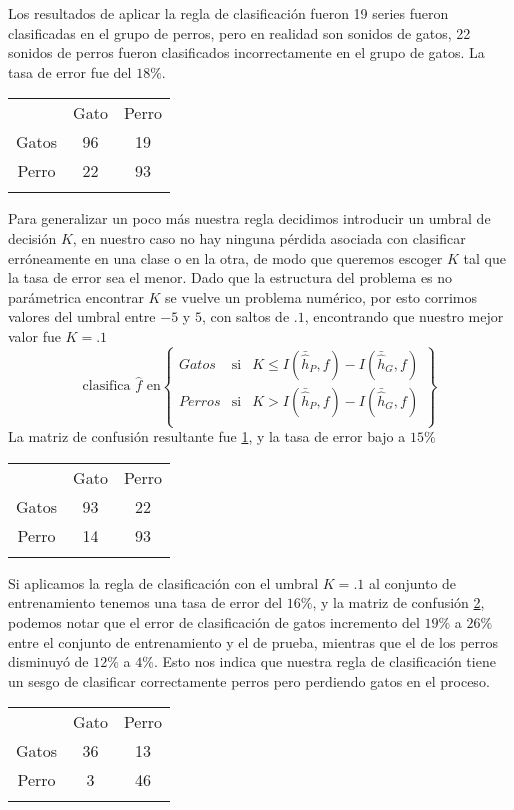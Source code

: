 \documentclass[twocolumn,10pt]{asme2ej}
\begin{document}
Los resultados de aplicar la regla de clasificaci\'on fueron 19 series fueron clasificadas en el grupo de perros, pero en realidad son sonidos de gatos, 22 sonidos de perros fueron clasificados incorrectamente en el grupo de gatos. La tasa de error fue del $18\%$.\\
\begin{tabular}{ccc}
 & Gato & Perro\\
 Gatos & 96& 19\\
Perro & 22 & 93\\
\label{tbl:confusion_entre1}
\end{tabular}

Para generalizar un poco m\'as nuestra regla decidimos introducir un umbral de decisi\'on $K$, en nuestro caso no hay ninguna p\'erdida asociada con clasificar err\'oneamente en una clase o en la otra, de modo que queremos escoger $K$ tal que la tasa de error sea el menor. Dado que la estructura del problema es no par\'ametrica encontrar $K$ se vuelve un problema num\'erico, por esto corrimos valores del umbral entre $-5$ y $5$, con saltos de $.1$, encontrando que nuestro mejor valor fue $K=.1$
$$\text{clasifica } \hat{f} \text{ en}\left\{
\begin{array}{ccc}
Gatos &\text{si}&K\leq I(\bar{\hat{h}}_P, f)-I(\bar{\hat{h}}_G, f)\\
Perros &\text{si}&K> I(\bar{\hat{h}}_P, f)-I(\bar{\hat{h}}_G, f)\\
\end{array}
\right\}$$
La matriz de confusi\'on resultante fue \ref{tbl:confusion_entre2}, y la tasa de error bajo a $15\%$\\
\begin{table}[h]
\begin{tabular}{ccc}
 & Gato & Perro\\
 Gatos & 93& 22\\
Perro & 14 & 93\\
\label{tbl:confusion_entre2}
\end{tabular}
\end{table}

Si aplicamos la regla de clasificaci\'on con el umbral $K=.1$ al conjunto de entrenamiento tenemos una tasa de error del $16\%$, y la matriz de confusi\'on  \ref{tbl:confusion_prue1}, podemos notar que el error de clasificaci\'on de gatos incremento del $19\%$ a $26\%$ entre el conjunto de entrenamiento  y el de prueba, mientras que el de los perros disminuy\'o de $12\%$ a $4\%$. Esto nos indica que nuestra regla de clasificaci\'on tiene un sesgo de clasificar correctamente perros pero perdiendo gatos en el proceso.
\begin{table}[h]
\begin{tabular}{ccc}
 & Gato & Perro\\
 Gatos & 36& 13\\
Perro & 3 & 46\\
\label{tbl:confusion_prue1}
\end{tabular}
\end{table}
\end{document}
